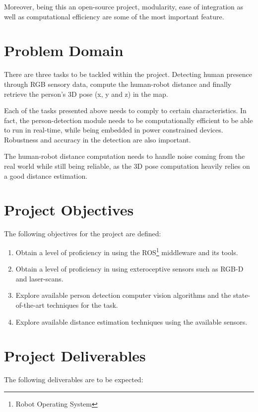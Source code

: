 Moreover, being this an open-source project, modularity, ease of integration as well as computational efficiency are some of the most important feature.

\section{Problem Domain}

There are three tasks to be tackled within the project. Detecting human presence through RGB sensory data, compute the human-robot distance and finally retrieve the person's 3D pose (x, y and z) in the map.

Each of the tasks presented above needs to comply to certain characteristics. In fact, the person-detection module needs to be computationally efficient to be able to run in real-time, while being embedded in power constrained devices. Robustness and accuracy in the detection are also important.

The human-robot distance computation needs to handle noise coming from the real world while still being reliable, as the 3D pose computation heavily relies on a good distance estimation. 

\section{Project Objectives}

The following objectives for the project are defined:

\begin{enumerate}
  \item Obtain a level of proficiency in using the ROS\footnote{Robot Operating
System} middleware and its tools.
	\item Obtain a level of proficiency in using exteroceptive sensors such as RGB-D and laser-scans.
  \item Explore available person detection computer vision algorithms and the state-of-the-art techniques for the task.
  \item Explore available distance estimation techniques using the available sensors.
\end{enumerate}

\section{Project Deliverables}

The following deliverables are to be expected:

